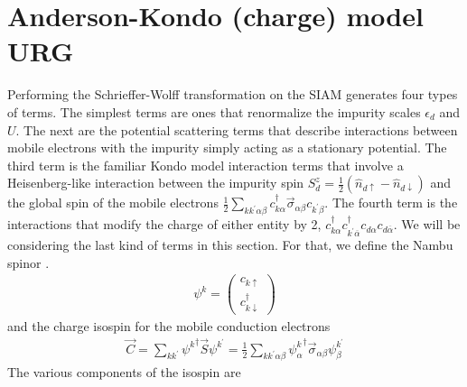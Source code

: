 \documentclass[twoside]{report}
\numberwithin{equation}{section}
\begin{document}
\section{Anderson-Kondo (charge) model URG}
Performing the Schrieffer-Wolff transformation on the SIAM generates four types of terms.
The simplest terms are ones that renormalize the impurity scales \(\epsilon_d\) and \(U\).
The next are the potential scattering terms that describe interactions between mobile electrons with the impurity simply acting as a stationary potential.
The third term is the familiar Kondo model interaction terms that involve a Heisenberg-like interaction between the impurity spin \(S_d^z = \frac{1}{2}\left(\hat n_{d\uparrow} - \hat n_{d\downarrow}\right)\) and the global spin of the mobile electrons \(\frac{1}{2}\sum_{kk^\prime \alpha\beta}c^\dagger_{k\alpha}\vec\sigma_{\alpha\beta}c_{k^\prime\beta}\).
The fourth term is the interactions that modify the charge of either entity by 2, \(c^\dagger_{k\alpha}c^\dagger_{k^\prime\overline\alpha}c_{d\alpha}c_{d\overline\alpha}\).
We will be considering the last kind of terms in this section.
For that, we define the Nambu spinor \cite{nambu,anderson_superc}.
\begin{equation}\begin{aligned}
\psi^k = \begin{pmatrix} c_{k\uparrow} \\ c^\dagger_{k\downarrow} \end{pmatrix}
\end{aligned}\end{equation}
and the charge isospin \cite{charge-kondo-Zitko} for the mobile conduction electrons
\begin{equation}\begin{aligned}
\vec C = \sum_{kk^\prime} {\psi^k}^\dagger \vec S \psi^{k^\prime} = \frac{1}{2}\sum_{kk^\prime\alpha\beta} {\psi^k_\alpha}^\dagger \vec \sigma_{\alpha\beta} \psi^{k^\prime}_\beta
\end{aligned}\end{equation}
The various components of the isospin are
\end{document}
